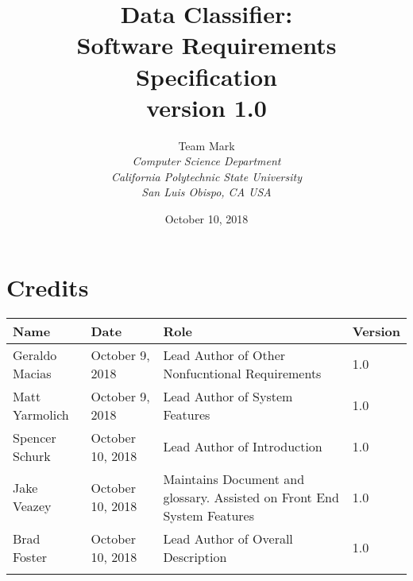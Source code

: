 \documentclass[12pt,oneside,letterpaper]{article}
\begin{document}
\title{\bfseries Data Classifier: \\
Software Requirements Specification\\
version 1.0}

\author {
\large{Team Mark}\\
\emph{Computer Science Department}\\
\emph{California Polytechnic State University}\\
\emph{San Luis Obispo, CA USA}\\
}

\date{October 10, 2018}
\maketitle \thispagestyle{empty}


\pagebreak
\tableofcontents



\section*{Credits}
\begin{tabular}{|l|l|p{2.5in}|l|}
\hline
\textbf{Name}&\textbf{Date}&\textbf{Role}&\textbf{Version}\\
\hline
Geraldo Macias&October 9, 2018&Lead Author of Other Nonfucntional Requirements&1.0\\
\hline
Matt Yarmolich&October 9, 2018&Lead Author of System Features&1.0\\
\hline
Spencer Schurk&October 10, 2018&Lead Author of Introduction&1.0\\
\hline
Jake Veazey&October 10, 2018&Maintains Document and glossary. Assisted on Front End System Features&1.0\\
\hline
Brad Foster&October 10, 2018&Lead Author of Overall Description&1.0\\
\hline
&&&\\
\hline
\end{tabular}
\end{document}
